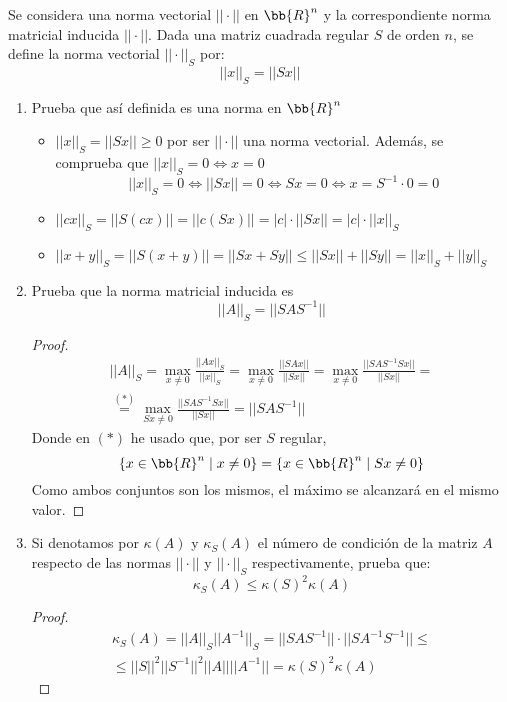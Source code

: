 \documentclass[12pt]{article}
\begin{document}
\begin{ejercicio} 
      Se considera una norma vectorial $||\cdot||$ en $\bb{R}^n$ y la correspondiente norma matricial inducida $||\cdot||$. Dada una matriz cuadrada regular $S$ de orden $n$, se define la norma vectorial $||\cdot||_S$ por:
     $$||x||_S = ||Sx||$$

     \begin{enumerate}
         \item Prueba que así definida es una norma en $\bb{R}^n$
         \begin{itemize}
             \item $||x||_S = ||Sx|| \geq 0$ por ser $||\cdot||$ una norma vectorial. Además, se comprueba que $||x||_S = 0 \Longleftrightarrow x=0$
             $$||x||_S = 0 \Longleftrightarrow ||Sx|| = 0 \Longleftrightarrow Sx = 0 \Longleftrightarrow x = S^{-1}\cdot 0 = 0$$

             \item $||cx||_S = ||S(cx)|| = ||c(Sx)|| = |c|\cdot ||Sx|| = |c| \cdot ||x||_S$

             \item $||x+y||_S = ||S(x+y)|| = ||Sx + Sy|| \leq ||Sx|| + ||Sy|| = ||x||_S + ||y||_S$
         \end{itemize}

         \item Prueba que la norma matricial inducida es
         $$||A||_S = ||SAS^{-1}||$$
         \begin{proof}
             \begin{multline*}
                 ||A||_S = \max_{x\neq 0} \frac{||Ax||_S}{||x||_S}
                 = \max_{x\neq 0} \frac{||SAx||}{||Sx||}
                 = \max_{x\neq 0} \frac{||SAS^{-1}Sx||}{||Sx||}
                 =\\ \stackrel{(\ast)}{=}
                 \max_{Sx\neq 0} \frac{||SAS^{-1}Sx||}{||Sx||} = ||SAS^{-1}||
             \end{multline*}
             Donde en $(\ast)$ he usado que, por ser $S$ regular,
             $$\{x\in \bb{R}^n \mid x\neq 0\} = \{x\in \bb{R}^n \mid Sx\neq 0\}$$
             Como ambos conjuntos son los mismos, el máximo se alcanzará en el mismo valor.
        \end{proof}

         \item Si denotamos por $\kappa(A)$ y $\kappa_S(A)$ el número de condición de la matriz $A$ respecto de las normas $||\cdot||$ y $||\cdot||_S$ respectivamente, prueba que:
         $$\kappa_S (A) \leq \kappa(S)^2\kappa(A)$$
         \begin{proof}
             \begin{multline*}
                 \kappa_S(A) = ||A||_S ||A^{-1}||_S = ||SAS^{-1}||\cdot ||SA^{-1}S^{-1}||
                 \leq \\ \leq
                 ||S||^2 ||S^{-1}||^2 ||A||||A^{-1}|| = \kappa(S)^2 \kappa(A)
             \end{multline*}
         \end{proof}
     \end{enumerate}
\end{ejercicio}
\end{document}
